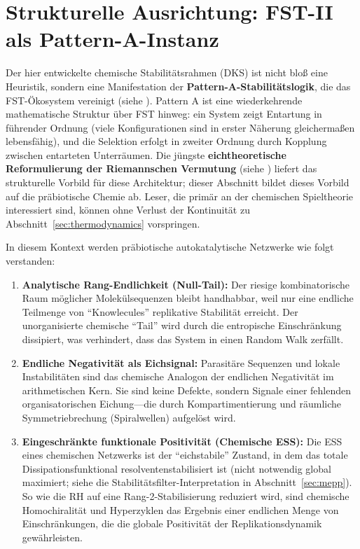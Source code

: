 \documentclass[12pt,a4paper]{article}
\theoremstyle{remark}
\begin{document}
\section{Strukturelle Ausrichtung: FST-II als Pattern-A-Instanz}
\label{sec:structural-alignment}

Der hier entwickelte chemische Stabilit\"atsrahmen (DKS) ist nicht blo\ss{} eine Heuristik, sondern eine Manifestation der \textbf{Pattern-A-Stabilit\"atslogik}, die das FST-\"Okosystem vereinigt (siehe \cite{FST-Unified2026}). Pattern A ist eine wiederkehrende mathematische Struktur \"uber FST hinweg: ein System zeigt Entartung in f\"uhrender Ordnung (viele Konfigurationen sind in erster N\"aherung gleicherma\ss{}en lebensfähig), und die Selektion erfolgt in zweiter Ordnung durch Kopplung zwischen entarteten Unterr\"aumen. Die j\"ungste \textbf{eichtheoretische Reformulierung der Riemannschen Vermutung} (siehe \cite{GeigerRH2026c}) liefert das strukturelle Vorbild f\"ur diese Architektur; dieser Abschnitt bildet dieses Vorbild auf die pr\"abiotische Chemie ab. Leser, die prim\"ar an der chemischen Spieltheorie interessiert sind, k\"onnen ohne Verlust der Kontinuit\"at zu Abschnitt~\ref{sec:thermodynamics} vorspringen.

In diesem Kontext werden pr\"abiotische autokatalytische Netzwerke wie folgt verstanden:
\begin{enumerate}[label=\alph*)]
    \item \textbf{Analytische Rang-Endlichkeit (Null-Tail):} Der riesige kombinatorische Raum m\"oglicher Molek\"ulsequenzen bleibt handhabbar, weil nur eine endliche Teilmenge von ``Knowlecules'' replikative Stabilit\"at erreicht. Der unorganisierte chemische ``Tail'' wird durch die entropische Einschr\"ankung dissipiert, was verhindert, dass das System in einen Random Walk zerf\"allt.
    \item \textbf{Endliche Negativit\"at als Eichsignal:} Parasit\"are Sequenzen und lokale Instabilit\"aten sind das chemische Analogon der endlichen Negativit\"at im arithmetischen Kern. Sie sind keine Defekte, sondern Signale einer fehlenden organisatorischen Eichung---die durch Kompartimentierung und r\"aumliche Symmetriebrechung (Spiralwellen) aufgel\"ost wird.
    \item \textbf{Eingeschr\"ankte funktionale Positivit\"at (Chemische ESS):} Die ESS eines chemischen Netzwerks ist der ``eichstabile'' Zustand, in dem das totale Dissipationsfunktional resolventenstabilisiert ist (nicht notwendig global maximiert; siehe die Stabilit\"atsfilter-Interpretation in Abschnitt~\ref{sec:mepp}). So wie die RH auf eine Rang-2-Stabilisierung reduziert wird, sind chemische Homochiralit\"at und Hyperzyklen das Ergebnis einer endlichen Menge von Einschr\"ankungen, die die globale Positivit\"at der Replikationsdynamik gew\"ahrleisten.
\end{enumerate}
\end{document}
